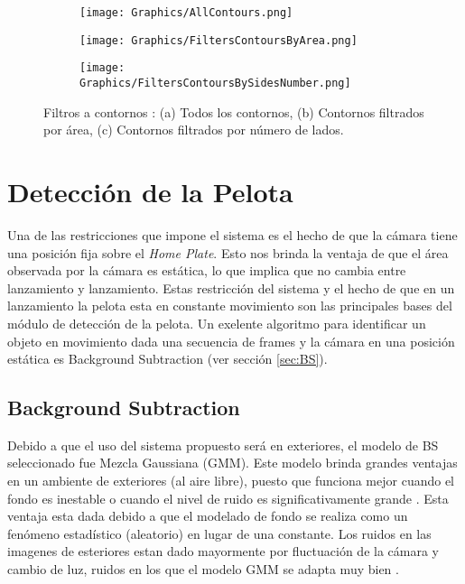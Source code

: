 \begin{figure}[h!]
	\centering
	\begin{subfigure}[b]{0.32\linewidth}
		\centering
		\texttt{[image: Graphics/AllContours.png]}
		\caption{}
	\end{subfigure}
	\begin{subfigure}[b]{0.32\linewidth}
		\centering
		\texttt{[image: Graphics/FiltersContoursByArea.png]}
		\caption{}
	\end{subfigure}    
	\begin{subfigure}[b]{0.32\linewidth}
		\centering
		\texttt{[image: Graphics/FiltersContoursBySidesNumber.png]}
		\caption{}
	\end{subfigure}    
	\caption{Filtros a contornos : (a) Todos los contornos, (b) Contornos filtrados por área, (c) Contornos filtrados por número de lados.}
	\label{fig:FilteredContours}
\end{figure}    

\section{Detección de la Pelota}

Una de las restricciones que impone el sistema es el hecho de que la cámara tiene una posición fija sobre el \textit{Home Plate}. Esto nos brinda la ventaja de que el área observada por la cámara es estática, lo que implica que no cambia entre lanzamiento y lanzamiento. Estas restricción del sistema y el hecho de que en un lanzamiento la pelota esta en constante movimiento son las principales bases del módulo de detección de la pelota. Un exelente algoritmo para identificar un objeto en movimiento dada una secuencia de frames y la cámara en una posición estática es Background Subtraction (ver sección \ref{sec:BS}).

\subsection{Background Subtraction}

Debido a que el uso del sistema propuesto será en exteriores, el modelo de BS seleccionado fue Mezcla Gaussiana (GMM). Este modelo brinda grandes ventajas en un ambiente de exteriores (al aire libre), puesto que funciona mejor cuando el fondo es inestable o cuando el nivel de ruido es significativamente grande \cite{YannickPierreMarcBrunoHeleneChristophe}. Esta ventaja esta dada debido a que el modelado de fondo se realiza como un fenómeno estadístico (aleatorio) en lugar de una constante. Los ruidos en las imagenes de esteriores estan dado mayormente por fluctuación de la cámara y cambio de luz, ruidos en los que el modelo GMM se adapta muy bien \cite{GMM}.

